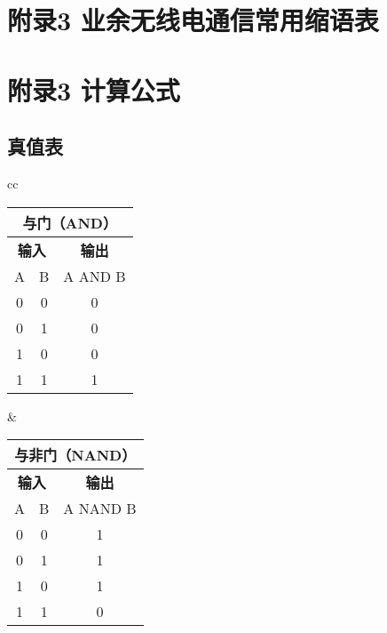 \newpage



\section*{附录3 业余无线电通信常用缩语表}

\newpage





\section*{附录3 计算公式}

\subsection*{真值表}

\begin{tabular}{cc}%
\begin{tabular}{|c|c|c|}
	\hline
	\multicolumn{3}{|c|}{\textbf{与门（AND）}} \\
	\hline
	\multicolumn{2}{|c|}{\textbf{输入}} & \textbf{输出} \\
	\hline
	A & B & A AND B \\
	\hline
	0 & 0 & 0 \\
	\hline
	0 & 1 & 0 \\
	\hline
	1 & 0 & 0 \\
	\hline
	1 & 1 & 1 \\
	\hline
\end{tabular} &
\begin{tabular}{|c|c|c|}
	\hline
	\multicolumn{3}{|c|}{\textbf{与非门（NAND）}} \\
	\hline
	\multicolumn{2}{|c|}{\textbf{输入}} & \textbf{输出} \\
	\hline
	A & B & A NAND B \\
	\hline
	0 & 0 & 1 \\
	\hline
	0 & 1 & 1 \\
	\hline
	1 & 0 & 1 \\
	\hline
	1 & 1 & 0 \\
	\hline
\end{tabular} \tabularnewline
\end{tabular}

\bigskip

